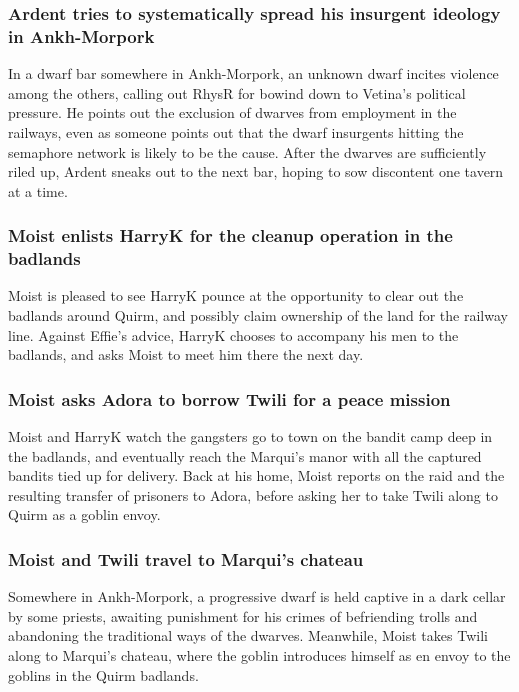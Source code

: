 \subsubsection{\Gls{Ardent} tries to systematically spread his insurgent ideology in Ankh-Morpork}
In a dwarf bar somewhere in Ankh-Morpork, an unknown dwarf incites violence among the others,
calling out \Gls{RhysR} for bowind down to \Gls{Vetina}'s political pressure. He points out the
exclusion of dwarves from employment in the railways, even as someone points out that the dwarf
insurgents hitting the semaphore network is likely to be the cause. After the dwarves are
sufficiently riled up, \Gls{Ardent} sneaks out to the next bar, hoping to sow discontent one tavern
at a time.

\subsubsection{\Gls{Moist} enlists \Gls{HarryK} for the cleanup operation in the badlands}
\Gls{Moist} is pleased to see \Gls{HarryK} pounce at the opportunity to clear out the badlands
around Quirm, and possibly claim ownership of the land for the railway line. Against \Gls{Effie}'s
advice, \Gls{HarryK} chooses to accompany his men to the badlands, and asks \Gls{Moist} to meet
him there the next day.

\subsubsection{\Gls{Moist} asks \Gls{Adora} to borrow \Gls{Twili} for a peace mission}
\Gls{Moist} and \Gls{HarryK} watch the gangsters go to town on the bandit camp deep in the badlands,
and eventually reach the \Gls{Marqui}'s manor with all the captured bandits tied up for delivery.
Back at his home, \Gls{Moist} reports on the raid and the resulting transfer of prisoners to
\Gls{Adora}, before asking her to take \Gls{Twili} along to Quirm as a goblin envoy.

\subsubsection{\Gls{Moist} and \Gls{Twili} travel to \Gls{Marqui}'s chateau}
Somewhere in Ankh-Morpork, a progressive dwarf is held captive in a dark cellar by some priests,
awaiting punishment for his crimes of befriending trolls and abandoning the traditional ways of
the dwarves. Meanwhile, \Gls{Moist} takes \Gls{Twili} along to \Gls{Marqui}'s chateau, where the
goblin introduces himself as en envoy to the goblins in the Quirm badlands.

